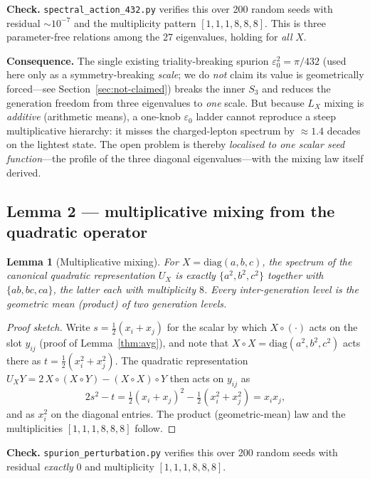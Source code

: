 \documentclass[11pt,a4paper]{article}
\theoremstyle{plain}
\newtheorem{lemma}{Lemma}
\newcommand{\code}[1]{\texttt{#1}}
\newcommand{\epso}{\varepsilon_0}
\begin{document}
\noindent\textbf{Check.} \code{spectral\_action\_432.py} verifies this over 200
random seeds with residual $\sim 10^{-7}$ and the multiplicity pattern
$[1,1,1,8,8,8]$. This is three parameter-free relations among the 27 eigenvalues,
holding for \emph{all} $X$.

\noindent\textbf{Consequence.} The single existing triality-breaking spurion
$\epso^2 = \pi/432$ (used here only as a symmetry-breaking \emph{scale}; we do
\emph{not} claim its value is geometrically forced---see
Section~\ref{sec:not-claimed}) breaks the inner $S_3$ and reduces the generation
freedom from
three eigenvalues to \emph{one} scale. But because $L_X$ mixing is \emph{additive}
(arithmetic means), a one-knob $\epso$ ladder cannot reproduce a steep
multiplicative hierarchy: it misses the charged-lepton spectrum by $\approx 1.4$
decades on the lightest state. The open problem is thereby \emph{localised to one
scalar seed function}---the profile of the three diagonal eigenvalues---with the
mixing law itself derived.

\subsection{Lemma 2 --- multiplicative mixing from the quadratic operator}

\begin{lemma}[Multiplicative mixing]
\label{thm:mult}
For $X = \mathrm{diag}(a,b,c)$, the spectrum of the canonical quadratic
representation $U_X$ is exactly $\{a^2,b^2,c^2\}$ together with
$\{ab, bc, ca\}$, the latter each with multiplicity $8$. Every inter-generation
level is the \emph{geometric mean} (product) of two generation levels.
\end{lemma}

\begin{proof}[Proof sketch]
Write $s = \tfrac12(x_i + x_j)$ for the scalar by which $X \circ (\cdot)$ acts on
the slot $y_{ij}$ (proof of Lemma~\ref{thm:avg}), and note that
$X \circ X = \mathrm{diag}(a^2,b^2,c^2)$ acts there as $t = \tfrac12(x_i^2 +
x_j^2)$. The quadratic representation $U_X Y = 2\,X\circ(X\circ Y) - (X\circ
X)\circ Y$ then acts on $y_{ij}$ as
\[
  2 s^2 - t = \tfrac12 (x_i + x_j)^2 - \tfrac12 (x_i^2 + x_j^2) = x_i x_j,
\]
and as $x_i^2$ on the diagonal entries. The product (geometric-mean) law and the
multiplicities $[1,1,1,8,8,8]$ follow.
\end{proof}

\noindent\textbf{Check.} \code{spurion\_perturbation.py} verifies this over 200
random seeds with residual \emph{exactly} $0$ and multiplicity $[1,1,1,8,8,8]$.
\end{document}
